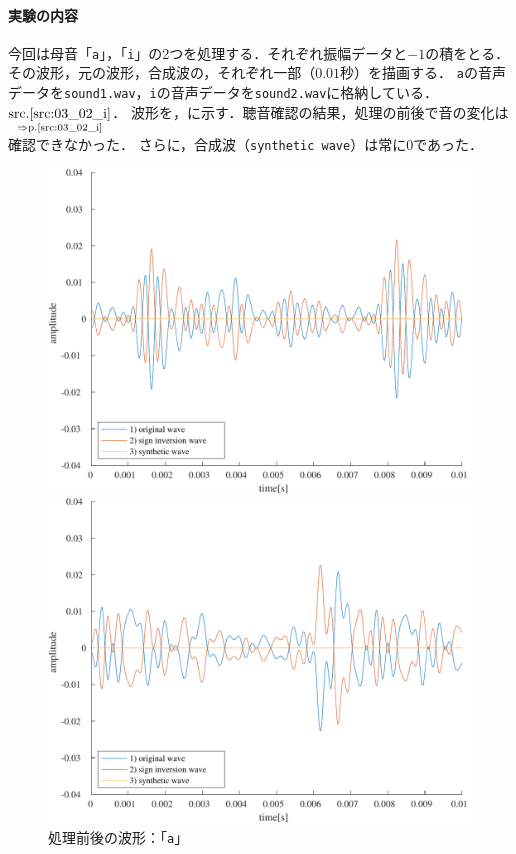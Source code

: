 \paragraph{実験の内容}
今回は母音「\texttt{a}」，「\texttt{i}」の2つを処理する．それぞれ振幅データと\(-1\)の積をとる．その波形，元の波形，合成波の，それぞれ一部（\(0.01\)秒）を描画する．
\texttt{a}の音声データを\texttt{sound1.wav}，\texttt{i}の音声データを\texttt{sound2.wav}に格納している．\(\underset{\Rightarrow\textrm{p.\pageref{src:03_02_i}}}{\textrm{\srcref{src:03_02_i}}}\)．
\result
波形を，に示す．聴音確認の結果，処理の前後で音の変化は確認できなかった．
さらに，合成波（\texttt{synthetic wave}）は常に\(0\)であった．
\begin{figure}[h]
    \centering
    \begin{minipage}[b]{.48\textwidth}
        \centering
        \includegraphics[keepaspectratio,width=\textwidth]{../../Figures/03_2_a.pdf}
        \caption{処理前後の波形：「\texttt{a}」}
        \label{fig:処理前後の波形_a}
    \end{minipage}
    \begin{minipage}[b]{.48\textwidth}
        \centering
        \includegraphics[keepaspectratio,width=\textwidth]{../../Figures/03_2_i.pdf}

\end{minipage}
\end{figure}
